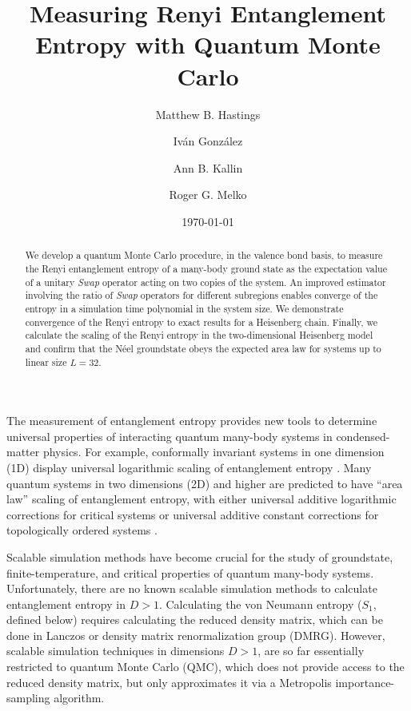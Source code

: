 \documentclass[prl,aps,twocolumn,floatfix,amsmath,amssymb,superscriptaddress,tightenlines]{revtex4}
\begin{document}
\date{\today}
\title{Measuring Renyi Entanglement Entropy with Quantum Monte Carlo}

\author{Matthew B. Hastings}

\author{Iv\'an Gonz\'alez}

\author{Ann B. Kallin}

\author{Roger G. Melko}

\begin{abstract} 


We develop a quantum Monte Carlo procedure, in the valence bond basis, to measure the Renyi entanglement entropy of a
many-body ground state as the expectation value of a unitary {\it Swap} operator acting on two copies of the system.
An improved estimator involving the ratio of {\it Swap} operators for different subregions enables converge of the entropy in a simulation time polynomial in the system size.  We demonstrate convergence of the Renyi entropy to exact results for a Heisenberg chain. Finally, we calculate the scaling of the Renyi entropy in the two-dimensional Heisenberg model and confirm that the N\'eel groundstate obeys the expected area law for systems up to linear size $L=32$.


\end{abstract}
\maketitle

The measurement of entanglement entropy  provides
new tools to determine universal properties of interacting quantum many-body systems in condensed-matter physics.  For example, conformally invariant
systems in one dimension (1D) display universal logarithmic
scaling of entanglement entropy \cite{Cardy}.  Many
quantum systems in two dimensions (2D) and higher are predicted to have ``area law''
scaling of entanglement entropy, with
either universal additive logarithmic corrections for critical systems \cite{corner,ryu} or
universal additive constant corrections for topologically ordered systems \cite{KP,LW}.

Scalable simulation methods have become crucial for the 
study of groundstate, finite-temperature, and critical properties of quantum
many-body systems.
Unfortunately, there are 
no known scalable simulation methods to calculate entanglement entropy in $D>1$.
Calculating the von Neumann entropy ($S_1$, defined below) requires calculating
the reduced density matrix,
which can be done in Lanczos 
or density matrix renormalization group (DMRG).  However, scalable simulation techniques in dimensions $D>1$,
are so far essentially
restricted to quantum Monte Carlo (QMC), which does not provide access to the reduced density matrix, but only approximates it
via a Metropolis importance-sampling algorithm. 
\end{document}
